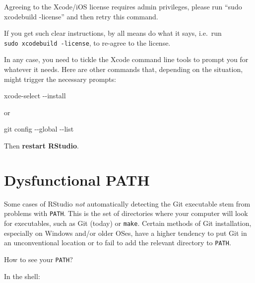 \documentclass[
]{book}
\newenvironment{Shaded}{\begin{snugshade}}{\end{snugshade}}
\newcommand{\NormalTok}[1]{#1}
\begin{document}
\begin{Shaded}
\begin{Highlighting}[]
\NormalTok{Agreeing to the Xcode/iOS license requires admin privileges, please run “sudo xcodebuild {-}license” and then retry this command.}
\end{Highlighting}
\end{Shaded}

If you get such clear instructions, by all means do what it says, i.e.~run \texttt{sudo\ xcodebuild\ -license}, to re-agree to the license.

In any case, you need to tickle the Xcode command line tools to prompt you for whatever it needs. Here are other commands that, depending on the situation, might trigger the necessary prompts:

\begin{Shaded}
\begin{Highlighting}[]
\NormalTok{xcode{-}select {-}{-}install}
\end{Highlighting}
\end{Shaded}

or

\begin{Shaded}
\begin{Highlighting}[]
\NormalTok{git config {-}{-}global {-}{-}list}
\end{Highlighting}
\end{Shaded}

Then \textbf{restart RStudio}.

\section{Dysfunctional PATH}\label{dysfunctional-path}

Some cases of RStudio \emph{not} automatically detecting the Git executable stem from problems with \texttt{PATH}.
This is the set of directories where your computer will look for executables, such as Git (today) or \texttt{make}.
Certain methods of Git installation, especially on Windows and/or older OSes, have a higher tendency to put Git in an unconventional location or to fail to add the relevant directory to \texttt{PATH}.

How to see your \texttt{PATH}?

In the shell:

\begin{Shaded}
\end{Shaded}
\end{document}
